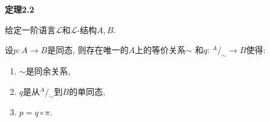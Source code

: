 \documentclass[UTF8]{ctexart}
\begin{document}
\hypertarget{sec:定理2.2}{}
\noindent\textbf{定理2.2}

给定一阶语言$\mathcal{L}$和$\mathcal{L}$-结构$A,B$.

设$p:A\to B$是同态, 则存在唯一的$A$上的等价关系$\sim$
和$q:\,^{\displaystyle A}\!/_{\displaystyle\sim}\to B$使得:
\begin{enumerate}
    \item $\sim$是同余关系,
    \vspace{3pt}
    \item $q$是从$^{\displaystyle A}\!/_{\displaystyle\sim}$到$B$的单同态,
    \item $p=q\circ\pi$.
\end{enumerate}


\end{document}
